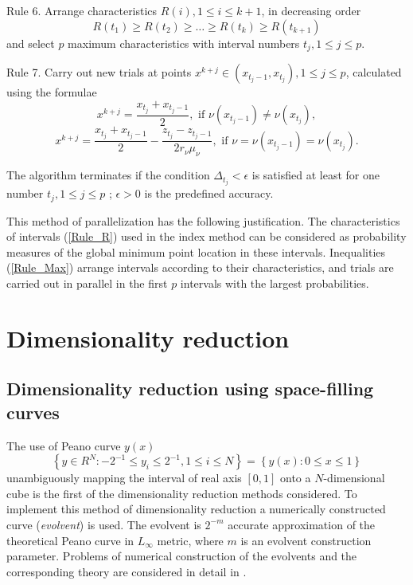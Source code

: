 \documentclass[a4paper]{jpconf}
\begin{document}
Rule 6. Arrange characteristics  $R(i), 1 \leq i \leq k+1$, in decreasing order 
\begin{equation}\label{Rule_Max}
R(t_1)\geq R(t_2)\geq \dots \geq R(t_{k}) \geq R(t_{k+1})
\end{equation}
and select $p$ maximum characteristics with interval numbers $t_j, 1\leq j \leq p$.

Rule 7. Carry out new trials at points $x^{k+j}\in(x_{t_j-1},x_{t_j}), 1\leq j\leq p$, calculated using the formulae
\[
x^{k+j} = \frac{x_{t_j} + x_{t_j-1}}{2}, \textrm{ if } \nu(x_{t{_j}-1}) \neq \nu(x_{t_j}),
\]
\begin{equation}\label{Rule_X}
x^{k+j} = \frac{x_{t_j}+x_{t_j-1}}{2} - \frac{z_{t_j}-z_{t_j-1}}{2r_\nu \mu_\nu}, \textrm{ if } \nu=\nu(x_{t_j-1})=\nu(x_{t_j}).
\end{equation}

The algorithm terminates if the condition $\Delta_{t_j}<\epsilon$ is satisfied at least for one number $t_j, 1 \leq j \leq p$ ; $\epsilon>0$ is the predefined accuracy.

This method of parallelization has the following justification. The characteristics of intervals (\ref{Rule_R}) used in the index method can be considered as probability measures of the global minimum point location in these intervals. Inequalities (\ref{Rule_Max}) arrange intervals according to their characteristics, and trials are carried out in parallel in the first $p$ intervals with the largest probabilities.


\section{Dimensionality reduction}

\subsection{Dimensionality reduction using space-filling curves}

The use of Peano curve $y(x)$ 
\[
\left\{y\in R^N: -2^{-1}\leq y_i \leq 2^{-1}, 1 \leq i \leq 
N\right\}=\left\{y(x):0\leq x \leq 1 \right\}
\]
unambiguously mapping the interval of real axis $[0,1]$ onto a $N$-dimensional cube is the first of the dimensionality reduction methods considered.  To implement this method of dimensionality reduction a 
numerically constructed curve (\textit{evolvent}) is used. The evolvent is 
$2^{-m}$ accurate approximation of the theoretical Peano curve in $L_\infty$ 
metric, where $m$ is an evolvent construction parameter. Problems of 
numerical construction of the evolvents and the corresponding theory are 
considered in detail in \cite{Strongin2000}. 
\end{document}
